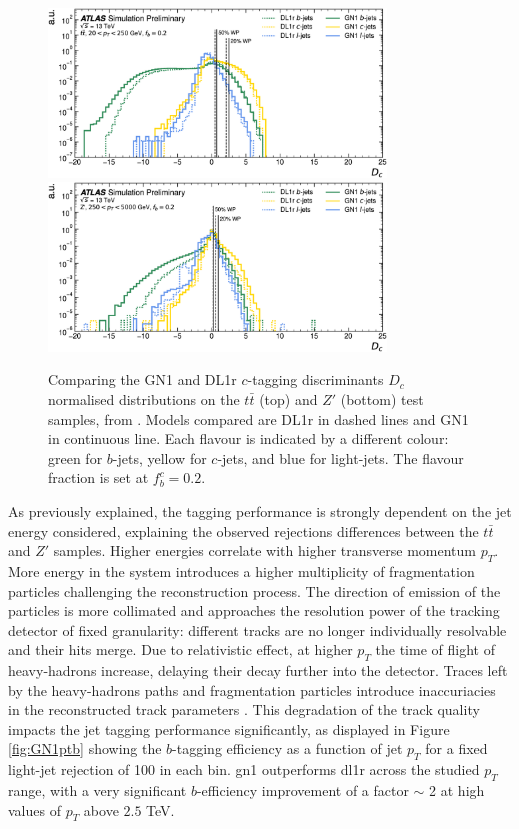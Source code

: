 \begin{figure}[h!]
  \centering
  \includegraphics[width=0.8\textwidth]{Images/FTAG/GN/GN1/eff/ttc.png}
  \includegraphics[width=0.8\textwidth]{Images/FTAG/GN/GN1/eff/zpc.png}
  \caption{Comparing the GN1 and DL1r $c$-tagging discriminants $D_c$ normalised distributions on the $t\bar{t}$ (top) and $Z'$ (bottom) test samples, from \cite{ATL-PHYS-PUB-2022-027}. Models compared are DL1r in dashed lines and GN1 in continuous line. Each flavour is indicated by a different colour: green for $b$-jets, yellow for $c$-jets, and blue for light-jets. The flavour fraction is set at $f^c_b = 0.2$.}
  \label{fig:GN1disc}
\end{figure} 

As previously explained, the tagging performance is strongly dependent on the jet energy considered, explaining the observed rejections differences between the $t\bar{t}$ and $Z'$ samples. Higher energies correlate with higher transverse momentum $p_T$. More energy in the system introduces a higher multiplicity of fragmentation particles challenging the reconstruction process. The direction of emission of the particles is more collimated and approaches the resolution power of the tracking detector of fixed granularity: different tracks are no longer individually resolvable and their hits merge. Due to relativistic effect, at higher $p_T$ the time of flight of heavy-hadrons increase, delaying their decay further into the detector. Traces left by the heavy-hadrons paths and fragmentation particles introduce inaccuriacies in the reconstructed track parameters \cite{ATLAS-tracks-algo}. This degradation of the track quality impacts the jet tagging performance significantly, as displayed in Figure \ref{fig:GN1ptb} showing the $b$-tagging efficiency as a function of jet $p_T$ for a fixed light-jet rejection of 100 in each bin. \gls{gn1} outperforms \gls{dl1r} across the studied $p_T$ range, with a very significant $b$-efficiency improvement of a factor $\sim$ 2 at high values of $p_T$ above $2.5$ TeV. 

